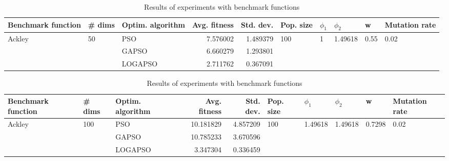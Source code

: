 \documentclass{article}
\begin{document}
\begin{table}
\centering
\caption{Results of experiments with benchmark functions}
\begin{tabular}{lllrrlllll}
\toprule
     Benchmark function &             \# dims & Optim. algorithm &  Avg. fitness &  Std. dev. &            Pop. size &         $\phi_{1}$ &               $\phi_{2}$ &                     w &         Mutation rate \\
\midrule
\multirow{3}{*}{Ackley} & \multirow{3}{*}{50} &              PSO &      7.576002 &   1.489379 & \multirow{3}{*}{100} & \multirow{3}{*}{1} & \multirow{3}{*}{1.49618} & \multirow{3}{*}{0.55} & \multirow{3}{*}{0.02} \\
                        &                     &            GAPSO &      6.660279 &   1.293801 &                      &                    &                          &                       &                       \\
                        &                     &          LOGAPSO &      2.711762 &   0.367091 &                      &                    &                          &                       &                       \\
\bottomrule
\end{tabular}
\end{table}
\begin{table}
\centering
\caption{Results of experiments with benchmark functions}
\begin{tabular}{lllrrlllll}
\toprule
     Benchmark function &              \# dims & Optim. algorithm &  Avg. fitness &  Std. dev. &            Pop. size &               $\phi_{1}$ &               $\phi_{2}$ &                       w &         Mutation rate \\
\midrule
\multirow{3}{*}{Ackley} & \multirow{3}{*}{100} &              PSO &     10.181829 &   4.857209 & \multirow{3}{*}{100} & \multirow{3}{*}{1.49618} & \multirow{3}{*}{1.49618} & \multirow{3}{*}{0.7298} & \multirow{3}{*}{0.02} \\
                        &                      &            GAPSO &     10.785233 &   3.670596 &                      &                          &                          &                         &                       \\
                        &                      &          LOGAPSO &      3.347304 &   0.336459 &                      &                          &                          &                         &                       \\
\bottomrule
\end{tabular}
\end{table}
\end{document}
